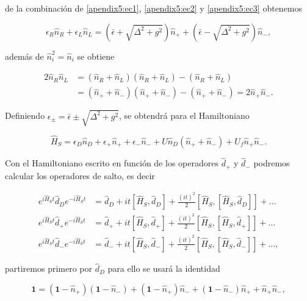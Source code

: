 \begin{appendixs}
de la combinación de \ref{apendix5:ec1}, \ref{apendix5:ec2} y \ref{apendix5:ec3} obtenemos

\begin{equation*}
    \epsilon_{R} \hat{n}_{R} + \epsilon_{L} \hat{n}_{L} = (\bar{\epsilon} + \sqrt{\Delta^{2} + g^{2}})\hat{n}_{+} +  (\bar{\epsilon} - \sqrt{\Delta^{2} + g^{2}})\hat{n}_{-},
\end{equation*}

además de $\hat{n}^{2}_{i} = \hat{n}_{i}$ se obtiene 

\begin{align*}
    2 \hat{n}_{R}\hat{n}_{L} & = (\hat{n}_{R} +\hat{n}_{L})(\hat{n}_{R} +\hat{n}_{L}) - (\hat{n}_{R} + \hat{n}_{L}) \\
    & = (\hat{n}_{+} +\hat{n}_{-})(\hat{n}_{+} +\hat{n}_{-}) - (\hat{n}_{+} + \hat{n}_{-})  = 2\hat{n}_{+}\hat{n}_{-}.
\end{align*}

Definiendo $\epsilon_{\pm} = \bar{\epsilon} \pm \sqrt{\Delta^{2}+g^{2}}$, se obtendrá para el Hamiltoniano

\begin{equation}
    \hat{H}_{S} = \epsilon_{D}\hat{n}_{D} + \epsilon_{+}\hat{n}_{+} + \epsilon_{-}\hat{n}_{-} + U\hat{n}_{D}(\hat{n}_{+} + \hat{n}_{-}) + U_{f}\hat{n}_{+}\hat{n}_{-}.
    \label{apendix5:ec4}
\end{equation}

Con el Hamiltoniano escrito en función de los operadores $\hat{d}_{+}$ y $\hat{d}_{-}$ podremos calcular los operadores de salto, es decir

\begin{align*}
    e^{i \hat{H}_{S}t}\hat{d}_{D}e^{-i\hat{H}_{S}t} & = \hat{d}_{D} + it[\hat{H}_{S},\hat{d}_{D}] + \frac{(it)^{2}}{2} [\hat{H}_{S},[\hat{H}_{S},\hat{d}_{D}]] +... \\
    e^{i \hat{H}_{S}t}\hat{d}_{+}e^{-i\hat{H}_{S}t} & = \hat{d}_{+} + it[\hat{H}_{S},\hat{d}_{+}] + \frac{(it)^{2}}{2} [\hat{H}_{S},[\hat{H}_{S},\hat{d}_{+}]] +... \\
    e^{i \hat{H}_{S}t}\hat{d}_{-}e^{-i\hat{H}_{S}t} & = \hat{d}_{-} + it[\hat{H}_{S},\hat{d}_{-}] + \frac{(it)^{2}}{2} [\hat{H}_{S},[\hat{H}_{S},\hat{d}_{-}]] +...,
\end{align*}

partiremos primero por $\hat{d}_{D}$ para ello se usará la identidad

\begin{equation*}
    \textbf{1} = (\textbf{1} - \hat{n}_{+})(\textbf{1}-\hat{n}_{-}) + (\textbf{1} - \hat{n}_{+})\hat{n}_{-} + (\textbf{1} - \hat{n}_{-})\hat{n}_{+} + \hat{n}_{+}\hat{n}_{-},
\end{equation*}


\end{appendixs}
